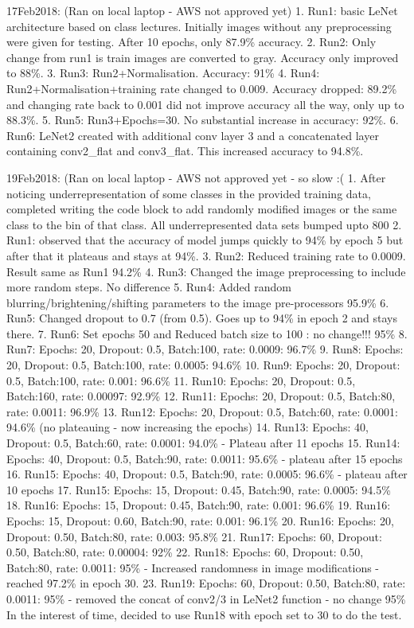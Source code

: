 \documentclass[11pt]{article}
\begin{document}
17Feb2018: (Ran on local laptop - AWS not approved yet) 1. Run1: basic
LeNet architecture based on class lectures. Initially images without any
preprocessing were given for testing. After 10 epochs, only 87.9\%
accuracy. 2. Run2: Only change from run1 is train images are converted
to gray. Accuracy only improved to 88\%. 3. Run3: Run2+Normalisation.
Accuracy: 91\% 4. Run4: Run2+Normalisation+training rate changed to
0.009. Accuracy dropped: 89.2\% and changing rate back to 0.001 did not
improve accuracy all the way, only up to 88.3\%. 5. Run5:
Run3+Epochs=30. No substantial increase in accuracy: 92\%. 6. Run6:
LeNet2 created with additional conv layer 3 and a concatenated layer
containing conv2\_flat and conv3\_flat. This increased accuracy to
94.8\%.

19Feb2018: (Ran on local laptop - AWS not approved yet - so slow :( 1.
After noticing underrepresentation of some classes in the provided
training data, completed writing the code block to add randomly modified
images or the same class to the bin of that class. All underrepresented
data sets bumped upto 800 2. Run1: observed that the accuracy of model
jumps quickly to 94\% by epoch 5 but after that it plateaus and stays at
94\%. 3. Run2: Reduced training rate to 0.0009. Result same as Run1
94.2\% 4. Run3: Changed the image preprocessing to include more random
steps. No difference 5. Run4: Added random blurring/brightening/shifting
parameters to the image pre-processors 95.9\% 6. Run5: Changed dropout
to 0.7 (from 0.5). Goes up to 94\% in epoch 2 and stays there. 7. Run6:
Set epochs 50 and Reduced batch size to 100 : no change!!! 95\% 8. Run7:
Epochs: 20, Dropout: 0.5, Batch:100, rate: 0.0009: 96.7\% 9. Run8:
Epochs: 20, Dropout: 0.5, Batch:100, rate: 0.0005: 94.6\% 10. Run9:
Epochs: 20, Dropout: 0.5, Batch:100, rate: 0.001: 96.6\% 11. Run10:
Epochs: 20, Dropout: 0.5, Batch:160, rate: 0.00097: 92.9\% 12. Run11:
Epochs: 20, Dropout: 0.5, Batch:80, rate: 0.0011: 96.9\% 13. Run12:
Epochs: 20, Dropout: 0.5, Batch:60, rate: 0.0001: 94.6\% (no plateauing
- now increasing the epochs) 14. Run13: Epochs: 40, Dropout: 0.5,
Batch:60, rate: 0.0001: 94.0\% - Plateau after 11 epochs 15. Run14:
Epochs: 40, Dropout: 0.5, Batch:90, rate: 0.0011: 95.6\% - plateau after
15 epochs 16. Run15: Epochs: 40, Dropout: 0.5, Batch:90, rate: 0.0005:
96.6\% - plateau after 10 epochs 17. Run15: Epochs: 15, Dropout: 0.45,
Batch:90, rate: 0.0005: 94.5\% 18. Run16: Epochs: 15, Dropout: 0.45,
Batch:90, rate: 0.001: 96.6\% 19. Run16: Epochs: 15, Dropout: 0.60,
Batch:90, rate: 0.001: 96.1\% 20. Run16: Epochs: 20, Dropout: 0.50,
Batch:80, rate: 0.003: 95.8\% 21. Run17: Epochs: 60, Dropout: 0.50,
Batch:80, rate: 0.00004: 92\% 22. Run18: Epochs: 60, Dropout: 0.50,
Batch:80, rate: 0.0011: 95\% - Increased randomness in image
modifications - reached 97.2\% in epoch 30. 23. Run19: Epochs: 60,
Dropout: 0.50, Batch:80, rate: 0.0011: 95\% - removed the concat of
conv2/3 in LeNet2 function - no change 95\% In the interest of time,
decided to use Run18 with epoch set to 30 to do the test.
\end{document}
